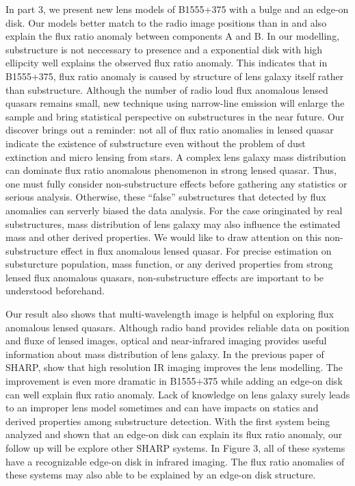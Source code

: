 \documentclass[manuscript]{emulateapj}
\begin{document}
In part 3, we present new lens models of B1555+375 with a bulge and an edge-on disk. Our models better match to the radio image positions than in \citet{Marlow} and also explain the flux ratio anomaly between components A and B. In our modelling, substructure is not neccessary to presence and a  exponential disk with high ellipcity well explains the observed flux ratio anomaly. This indicates that in B1555+375, flux ratio anomaly is caused by structure of lens galaxy itself rather than substructure. Although the number of radio loud flux anomalous lensed quasars remains small, new technique using narrow-line emission will enlarge the sample and bring statistical perspective on substructures in the near future. Our discover brings out a reminder: not all of flux ratio anomalies in lensed quasar indicate the existence of substructure even without the problem of dust extinction and micro lensing from stars. A complex lens galaxy mass distribution can dominate flux ratio anomalous phenomenon in strong lensed quasar. Thus, one must fully consider non-substructure effects before gathering any statistics or serious analysis. Otherwise, these ``false'' substructures that detected by flux anomalies can serverly biased the data analysis. For the case oringinated by real  substructures, mass distribution of lens galaxy may also influence the estimated mass and other derived properties. We would like to draw attention on this non-substructure effect in flux anomalous lensed quasar. For precise estimation on substurcture population, mass function, or any derived properties from strong lensed flux anomalous quasars, non-substructure effects are important to be understood beforehand.

Our result also shows that multi-wavelength image is helpful on exploring flux anomalous lensed quasars. Although radio band provides reliable data on position and fluxe of lensed images, optical and near-infrared imaging provides useful information about mass distribution of lens galaxy. In the previous paper of SHARP, \citet{SHARP12} show that high resolution IR imaging improves the lens modelling. The improvement is even more dramatic in B1555+375 while adding an edge-on disk can well explain flux ratio anomaly. Lack of knowledge on lens galaxy surely leads to an improper lens model sometimes and can have impacts on statics and derived properties among substructure detection. With the first system being analyzed and shown that an edge-on disk can explain its flux ratio anomaly, our follow up will be explore other SHARP systems. In Figure 3, all of these systems have a recognizable edge-on disk in infrared imaging. The flux ratio anomalies of these systems may also able to be explained by an edge-on disk structure.\\
 







\end{document}

